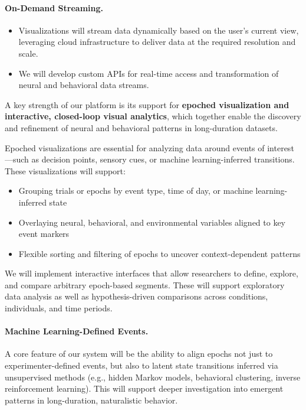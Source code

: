 \paragraph{On-Demand Streaming.}
\begin{itemize}
          \item Visualizations will stream data dynamically based on the user’s
              current view, leveraging cloud infrastructure to deliver data at
              the required resolution and scale.
                \item We will develop custom APIs for real-time access and
                    transformation of neural and behavioral data streams.
\end{itemize}

\label{sec:visEpochedInteractive}

A key strength of our platform is its support for \textbf{epoched visualization and interactive, closed-loop visual analytics}, which together enable the discovery and refinement of neural and behavioral patterns in long-duration datasets.

Epoched visualizations are essential for analyzing data around events of interest—such as decision points, sensory cues, or machine learning-inferred transitions. These visualizations will support:
\begin{itemize}
  \item Grouping trials or epochs by event type, time of day, or machine learning-inferred state
  \item Overlaying neural, behavioral, and environmental variables aligned to key event markers
  \item Flexible sorting and filtering of epochs to uncover context-dependent patterns
\end{itemize}

We will implement interactive interfaces that allow researchers to define, explore, and compare arbitrary epoch-based segments. These will support exploratory data analysis as well as hypothesis-driven comparisons across conditions, individuals, and time periods.

\paragraph{Machine Learning-Defined Events.}
A core feature of our system will be the ability to align epochs not just to experimenter-defined events, but also to latent state transitions inferred via unsupervised methods (e.g., hidden Markov models, behavioral clustering, inverse reinforcement learning). This will support deeper investigation into emergent patterns in long-duration, naturalistic behavior.

